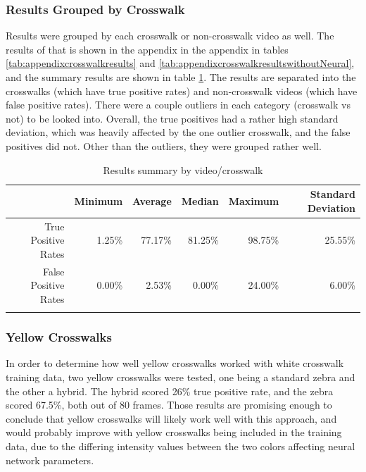 \documentclass[12pt]{ucthesis}
\begin{document}
\subsubsection{Results Grouped by Crosswalk}

Results were grouped by each crosswalk or non-crosswalk video as well. The results of that is shown in the appendix in the appendix in tables \ref{tab:appendixcrosswalkresults} and \ref{tab:appendixcrosswalkresultswithoutNeural}, and the summary results are shown in table \ref{tab:crosswalkResultsSummary}. The results are separated into the crosswalks (which have true positive rates) and non-crosswalk videos (which have false positive rates).  There were a couple outliers in each category (crosswalk vs not) to be looked into. Overall, the true positives had a rather high standard deviation, which was heavily affected by the one outlier crosswalk, and the false positives did not. Other than the outliers, they were grouped rather well.

\begin{center}
    \begin{longtable}[H]{|r|r|r|r|r|r|}
    \cline{2-6}    \multicolumn{1}{r|}{} & Minimum & Average & Median & Maximum & Standard Deviation \bigstrut\\
    \hline
    True Positive Rates & 1.25\% & 77.17\% & 81.25\% & 98.75\% & 25.55\% \bigstrut\\
    \hline
    False Positive Rates & 0.00\% & 2.53\% & 0.00\% & 24.00\% & 6.00\% \bigstrut\\
    \hline


    \caption{Results summary by video/crosswalk}
    \label{tab:crosswalkResultsSummary} 
    \end{longtable}
\end{center}

\subsubsection{Yellow Crosswalks}

In order to determine how well yellow crosswalks worked with white crosswalk training data, two yellow crosswalks were tested, one being a standard zebra and the other a hybrid. The hybrid scored 26\% true positive rate, and the zebra scored 67.5\%, both out of 80 frames. Those results are promising enough to conclude that yellow crosswalks will likely work well with this approach, and would probably improve with yellow crosswalks being included in the training data, due to the differing intensity values between the two colors affecting neural network parameters. 
\end{document}
